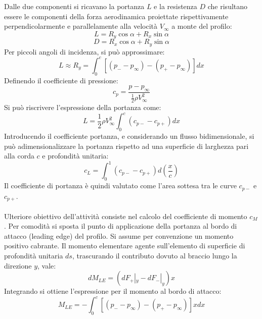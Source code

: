 Dalle due componenti si ricavano la portanza $L$ e la resistenza $D$ che risultano essere le componenti della forza aerodinamica proiettate rispettivamente perpendicolarmente e parallelamente alla velocità $V_\infty$ a monte del profilo:
\begin{equation*}
    L = R_y \cos \alpha + R_x \sin \alpha
\end{equation*}
\begin{equation*}
    D = R_x \cos \alpha + R_y \sin \alpha
\end{equation*}
Per piccoli angoli di incidenza, si può approssimare:
\begin{equation*}
    L\approx R_y = \int_0^c \left[ (p_--p_\infty) - (p_+-p_\infty) \right] dx
\end{equation*}
Definendo il coefficiente di pressione:
\begin{equation*}
    c_p = \frac{p-p_\infty}{\frac12 \rho V_\infty^2}
\end{equation*}
Si può riscrivere l'espressione della portanza come:
\begin{equation*}
    L = \frac12 \rho V^2_\infty \int_0^c (c_{p-}-c_{p+})dx
\end{equation*}
Introducendo il coefficiente portanza, e considerando un flusso bidimensionale, si può adimensionalizzare la portanza rispetto ad una superficie di larghezza pari alla corda $c$ e profondità unitaria:
\begin{equation*}
    c_L = \int_0^1(c_{p-}-c_{p+})d\left( \frac xc \right)
\end{equation*}
Il coefficiente di portanza è quindi valutato come l'area sottesa tra le curve $c_{p-}$ e $c_{p+}$.\\\\
Ulteriore obiettivo dell'attività consiste nel calcolo del coefficiente di momento $c_M$. Per comodità si sposta il punto di applicazione della portanza al bordo di attacco (leading edge) del profilo. Si assume per convenzione un momento positivo cabrante. Il momento elementare agente sull'elemento di superficie di profondità unitaria $ds$, trascurando il contributo dovuto al braccio lungo la direzione $y$, vale:
\begin{equation*}
    dM_{LE} = (dF_+|_y - dF_-|_y) x
\end{equation*}
Integrando si ottiene l'espressione per il momento al bordo di attacco:
\begin{equation*}
    M_{LE} = -\int_0^c \left[ (p_- - p_\infty)- (p_+ - p_\infty) \right] xdx
\end{equation*}
